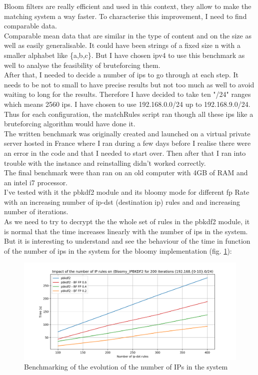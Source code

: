 \documentclass{eplmastersthesis}
\begin{document}
Bloom filters are really efficient and used in this context, they allow to make the matching system a way faster. To characterise this improvement, I need to find comparable data.\\
Comparable mean data that are similar in the type of content and on the size as well as easily generalisable. It could have been strings of a fixed size n with a smaller alphabet like \{a,b,c\}. But I have chosen \gls{ipv4} to use this benchmark as well to analyse the feasibility of  bruteforcing them.\\
After that, I needed to decide a number of \gls{ip}s to go through at each step. It needs to be not to small to have precise results but not too much as well to avoid waiting to long for the results. Therefore I have decided to take ten "/24" ranges which means 2560 \gls{ip}s. I have chosen to use 192.168.0.0/24 up to 192.168.9.0/24.\\
Thus for each configuration, the matchRules script ran though all these \gls{ip}s like a bruteforcing algorithm would have done it.\\

The written benchmark was originally created and launched on a virtual private server hosted in France where I ran during a few days before I realise there were an error in the code and that I needed to start over. Then after that I ran into trouble with the instance and reinstalling didn't worked correctly.\\
The final benchmark were than ran on an old computer with 4GB of RAM and an intel i7 processor.\\
I've tested with it the \gls{pbkdf2} module and its bloomy mode for different \gls{fp} Rate with an increasing number of ip-dst (destination \gls{ip}) rules and and increasing number of iterations.\\

As we need to try to decrypt the the whole set of rules in the \gls{pbkdf2} module, it is normal that the time increases linearly with the number of \gls{ip}s in the system. But it is interesting to understand and see the behaviour of the time in function of the number of \gls{ip}s in the system for the bloomy implementation (fig. \ref{benchmarking:timeips}):

\begin{figure}[h!]
\begin{center}
	\includegraphics[scale=0.6]{res/TimeIPs}
	\caption{Benchmarking of the evolution of the number of IPs in the system}
	\label{benchmarking:timeips}
\end{center}
\end{figure}
\end{document}
